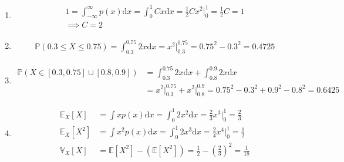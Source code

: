 \begin{enumerate}[label=\alph*.]
\item
\begin{align*}
1 = \int_{-\infty}^{\infty} p(x) \mathrm d x = \int_0^1 Cx \mathrm d x = \frac{1}{2} C x^2 \Big|_{0}^1 = \frac{1}{2}C = 1 \\
\implies C = 2
\end{align*}
\item
\begin{align*}
\mathbb{P}(0.3 \leq X \leq 0.75) = \int_{0.3}^{0.75} 2x \mathrm d x = x^2 \Big|_{0.3}^{0.75} = 0.75^2 - 0.3^2 = 0.4725
\end{align*}
\item
\begin{align*}
\mathbb{P}(X \in [0.3, 0.75] \cup [0.8, 0.9])
&= \int_{0.3}^{0.75} 2x \mathrm d x + \int_{0.8}^{0.9} 2x \mathrm d x \\
&= x^2 \Big|_{0.3}^{0.75} + x^2 \Big|_{0.8}^{0.9} = 0.75^2 - 0.3^2 + 0.9^2 - 0.8^2 = 0.6425
\end{align*}
\item
\begin{align*}
\mathbb{E}_X[X] &= \int x p(x) \mathrm d x = \int_0^1 2 x^2 \mathrm d x = \frac{2}{3} x^3 \Big|_0^1 = \frac{2}{3} \\
\mathbb{E}_X[X^2] &= \int x^2 p(x) \mathrm d x = \int_0^1 2 x^3 \mathrm d x = \frac{2}{4} x^4 \Big|_0^1 = \frac{1}{2} \\
\mathbb{V}_X[X] &= \mathbb{E}[X^2] - (\mathbb{E}[X^2]) = \frac{1}{2} - (\frac{2}{3})^2 = \frac{1}{18} \\
\end{align*}
\end{enumerate}

\paragraph{}

